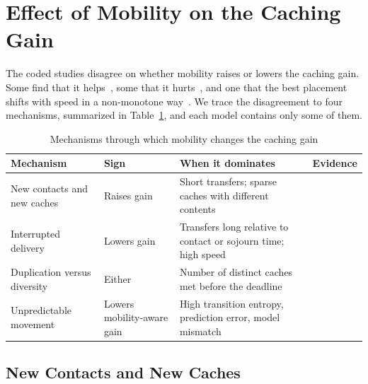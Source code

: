 
\section{Effect of Mobility on the Caching Gain}
\label{sec:effect}

The coded studies disagree on whether mobility raises or lowers the caching gain. Some find that it helps~\cite{krishnan2017mobility,wang2018exploiting,guan2014mobicacher,alnagar2022mobility}, some that it hurts~\cite{jarray2016mobility,semiari2018caching}, and one that the best placement shifts with speed in a non-monotone way~\cite{wang2017mobility}. We trace the disagreement to four mechanisms, summarized in Table~\ref{tab:mechanisms}, and each model contains only some of them.

\begin{table}[t]
\centering
\caption{Mechanisms through which mobility changes the caching gain}
\label{tab:mechanisms}
\footnotesize
\renewcommand{\arraystretch}{1.2}
\begin{tabular}{llll}
\hline
Mechanism & Sign & When it dominates & Evidence \\
\hline
New contacts and new caches & Raises gain & Short transfers; sparse caches with different contents & \cite{krishnan2017mobility,wang2018exploiting,hosny2016allerton,poularakis2013exploiting} \\
Interrupted delivery & Lowers gain & Transfers long relative to contact or sojourn time; high speed & \cite{jarray2016mobility,semiari2018caching,yu2021mobility,mahmood2019rich} \\
Duplication versus diversity & Either & Number of distinct caches met before the deadline & \cite{wang2017mobility,ozfatura2020mobility} \\
Unpredictable movement & Lowers mobility-aware gain & High transition entropy, prediction error, model mismatch & \cite{ozfatura2020mobility,abani2017proactive,mahmood2019rich} \\
\hline
\end{tabular}
\end{table}

\subsection{New Contacts and New Caches}
\label{subsec:mech-contacts}

